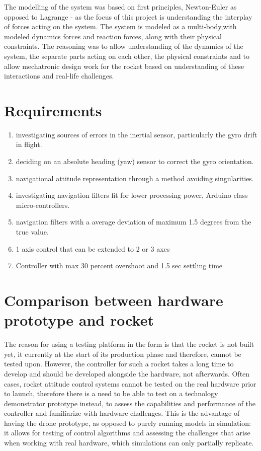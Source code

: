 The modelling of the system was based on first principles, Newton-Euler as opposed to Lagrange - as the focus of this project is understanding the interplay of forces acting on the system. The system is modeled as a multi-body,with modeled  dynamics forces and reaction forces, along with their physical constraints. The reasoning was to allow understanding of the dynamics of the system, the separate parts acting on each other, the physical constraints and to allow mechatronic design work for the rocket based on understanding of these interactions and real-life challenges. 


\section{Requirements}

\begin{enumerate}
\item investigating sources of errors in the inertial sensor, particularly the gyro drift in flight.
\item deciding on an absolute heading (yaw) sensor to correct the gyro orientation. 
\item navigational attitude representation through a method avoiding singularities. 
\item investigating navigation filters fit for lower processing power, Arduino class micro-controllers.
\item navigation filters with a average deviation of maximum 1.5 degrees from the true value.
\item 1 axis control that can be extended to 2 or 3 axes
\item Controller with max 30 percent overshoot and 1.5 sec settling time
\end{enumerate}


\section{Comparison between hardware prototype and rocket}

The reason for using a testing platform in the form is that the rocket is not built yet, it currently at the start of its production phase and therefore, cannot be tested upon. However, the controller for such a rocket takes a long time to develop and should be developed alongside the hardware, not afterwards. Often cases, rocket attitude control systems cannot be tested on the real hardware prior to launch, therefore there is a need to be able to test on a technology demonstrator prototype instead, to assess the capabilities and performance of the controller and familiarize with hardware challenges. This is the advantage of having the drone prototype, as opposed to purely running models in simulation: it allows for testing of control algorithms and assessing the challenges that arise when working with real hardware, which simulations can only partially replicate. 


